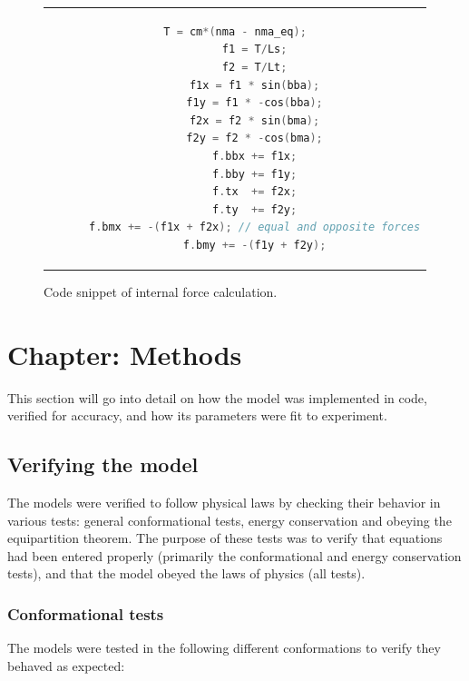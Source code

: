 \documentclass[10pt]{article} %
\begin{document}
\begin{figure}[h]
  \centering
  \begin{tabular}{c}
    \begin{lstlisting}[language=C++]
      T = cm*(nma - nma_eq);
      f1 = T/Ls;
      f2 = T/Lt;
      f1x = f1 * sin(bba);
      f1y = f1 * -cos(bba);
      f2x = f2 * sin(bma);
      f2y = f2 * -cos(bma);
      f.bbx += f1x;
      f.bby += f1y;
      f.tx  += f2x;
      f.ty  += f2y;
      f.bmx += -(f1x + f2x); // equal and opposite forces
      f.bmy += -(f1y + f2y);
    \end{lstlisting}
  \end{tabular}
  \caption{Code snippet of internal force calculation.}
  \label{transition-rate-snippet}
\end{figure}

\section{Chapter: Methods}
This section will go into detail on how the model was implemented in code, verified for accuracy, and how its parameters were fit to experiment.\\

\subsection{Verifying the model}
The models were verified to follow physical laws by checking their behavior in various tests: general conformational tests, energy conservation and obeying the equipartition theorem. The purpose of these tests was to verify that equations had been entered properly (primarily the conformational and energy conservation tests), and that the model obeyed the laws of physics (all tests).

\subsubsection{Conformational tests}
The models were tested in the following different conformations to verify they behaved as expected:\\
\end{document}
